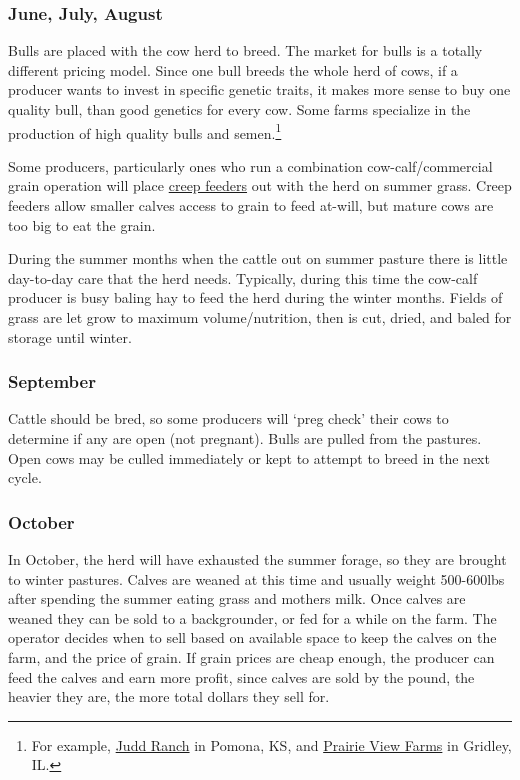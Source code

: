 \documentclass[
  letterpaper,
  DIV=11,
  numbers=noendperiod]{scrreprt}
\begin{document}
\subsubsection{June, July, August}\label{june-july-august}

Bulls are placed with the cow herd to breed. The market for bulls is a
totally different pricing model. Since one bull breeds the whole herd of
cows, if a producer wants to invest in specific genetic traits, it makes
more sense to buy one quality bull, than good genetics for every cow.
Some farms specialize in the production of high quality bulls and
semen.\footnote{For example, \href{http://www.juddranch.com/}{Judd
  Ranch} in Pomona, KS, and \href{http://www.pvfangus.com/}{Prairie View
  Farms} in Gridley, IL.}

Some producers, particularly ones who run a combination
cow-calf/commercial grain operation will place
\href{https://www.google.com/search?q=creep+feeder&espv=2&biw=1920&bih=1075&source=lnms&tbm=isch&sa=X&ved=0CAcQ_AUoAmoVChMI18ne2paTyQIVSJUeCh3eMw5X}{creep
feeders} out with the herd on summer grass. Creep feeders allow smaller
calves access to grain to feed at-will, but mature cows are too big to
eat the grain.

During the summer months when the cattle out on summer pasture there is
little day-to-day care that the herd needs. Typically, during this time
the cow-calf producer is busy baling hay to feed the herd during the
winter months. Fields of grass are let grow to maximum volume/nutrition,
then is cut, dried, and baled for storage until winter.

\subsubsection{September}\label{september}

Cattle should be bred, so some producers will `preg check' their cows to
determine if any are open (not pregnant). Bulls are pulled from the
pastures. Open cows may be culled immediately or kept to attempt to
breed in the next cycle.

\subsubsection{October}\label{october}

In October, the herd will have exhausted the summer forage, so they are
brought to winter pastures. Calves are weaned at this time and usually
weight 500-600lbs after spending the summer eating grass and mothers
milk. Once calves are weaned they can be sold to a backgrounder, or fed
for a while on the farm. The operator decides when to sell based on
available space to keep the calves on the farm, and the price of grain.
If grain prices are cheap enough, the producer can feed the calves and
earn more profit, since calves are sold by the pound, the heavier they
are, the more total dollars they sell for.
\end{document}
